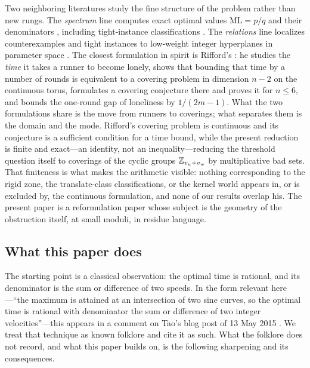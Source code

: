 Two neighboring literatures study the fine structure of the problem rather
than new rungs. The \emph{spectrum} line computes exact optimal values
$\mathrm{ML}=p/q$ and their denominators
\cite{Kravitz,FanSun,GiriKravitz,Cordella}, including tight-instance
classifications \cite{Zhang}. The \emph{relations} line localizes
counterexamples and tight instances to low-weight integer hyperplanes in
parameter space \cite{BeckEverett}. The closest formulation in spirit is
Rifford's \cite{Rifford}: he studies the \emph{time} it takes a runner to
become lonely, shows that bounding that time by a number of rounds is
equivalent to a covering problem in dimension $n-2$ on the continuous torus,
formulates a covering conjecture there and proves it for $n\le 6$, and
bounds the one-round gap of loneliness by $1/(2m-1)$. What the two
formulations share is the move from runners to coverings; what separates
them is the domain and the mode. Rifford's covering problem is continuous
and its conjecture is a sufficient condition for a time bound, while the
present reduction is finite and exact---an identity, not an
inequality---reducing the threshold question itself to coverings of the
cyclic groups $\mathbb{Z}_{v_u+v_w}$ by multiplicative bad sets. That finiteness is
what makes the arithmetic visible: nothing corresponding to the rigid zone,
the translate-class classifications, or the kernel world appears in, or is
excluded by, the continuous formulation, and none of our results overlap
his. The present paper is a reformulation paper whose subject is the
geometry of the obstruction itself, at small moduli, in residue language.

\subsection{What this paper does}

The starting point is a classical observation: the optimal time is rational,
and its denominator is the sum or difference of two speeds. In the form
relevant here---``the maximum is attained at an intersection of two sine
curves, so the optimal time is rational with denominator the sum or
difference of two integer velocities''---this appears in a comment on Tao's
blog post of 13 May 2015 \cite{Tao-blog}. We treat that technique as known
folklore and cite it as such. What the folklore does not record, and what
this paper builds on, is the following sharpening and its consequences.

